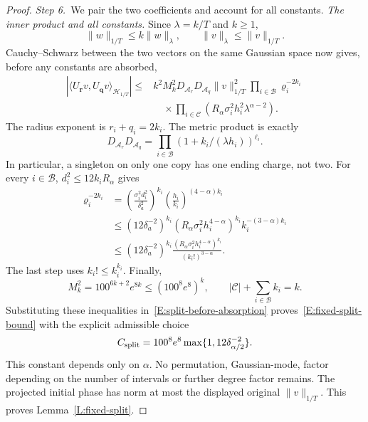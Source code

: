 \documentclass[12pt,oneside,openany]{book}
\numberwithin{equation}{section}
\theoremstyle{nogostyle}
\theoremstyle{definition}
\begin{document}
\begin{proof}
  \medskip
  \noindent\textit{Step 6.~}We pair the two coefficients and account for all
  constants.
  \emph{The inner product and all constants.} Since $\lambda = k/T$ and $k \ge
  1$,
  \[
    \|w\|_{1/T}\le k\|w\|_\lambda,\qquad
    \|v\|_\lambda\le\|v\|_{1/T}.
  \]
  Cauchy--Schwarz between the two vectors on the same Gaussian space now gives,
  before any constants are absorbed,
  \begin{equation}\label{E:split-before-absorption}
    \begin{split}
      |\langle U_{\boldsymbol r}v,U_{\boldsymbol q}v
      \rangle_{\mathcal{H}_{1/T}}|
      \le{}&k^2 M_k^2D_{\mathcal{A}_r}D_{\mathcal{A}_q}
      \|v\|_{1/T}^2
      \prod_{i\in\mathcal{B}}\varrho_i^{-2k_i}\\
      &\quad\times\prod_{i\in\mathcal{C}}
      (R_\alpha\sigma_i^2h_i^2\lambda^{\alpha-2}).
    \end{split}
  \end{equation}
  The radius exponent is $r_i+q_i = 2k_i$. The metric product is exactly
  \[
    D_{\mathcal{A}_r}D_{\mathcal{A}_q}
    =\prod_{i\in\mathcal{B}}(1+k_i/(\lambda h_i))^{\ell_i}.
  \]
  In particular, a singleton on only one copy has one ending charge, not two.
  For every $i \in \mathcal{B}$, $d_i^2 \le 12k_iR_\alpha$ gives
  \begin{equation}\label{E:split-radius-factorial}
    \begin{split}
      \varrho_i^{-2k_i}
      &=\left(\frac{\sigma_i^2d_i^2}{\delta_a^2}\right)^{k_i}
      \left(\frac{h_i}{k_i}\right)^{(4-\alpha)k_i}\\
      &\le(12\delta_a^{-2})^{k_i}
      (R_\alpha\sigma_i^2h_i^{4-\alpha})^{k_i}
      k_i^{-(3-\alpha)k_i}\\
      &\le(12\delta_a^{-2})^{k_i}
      \frac{(R_\alpha\sigma_i^2h_i^{4-\alpha})^{k_i}}
      {(k_i!)^{3-\alpha}}.
    \end{split}
  \end{equation}
  The last step uses $k_i! \le k_i^{k_i}$. Finally,
  \[
    M_k^2=100^{6k+2}e^{8k}\le(100^8e^8)^k,
    \qquad |\mathcal{C}|+\sum_{i\in\mathcal{B}}k_i=k.
  \]
  Substituting these inequalities in~\eqref{E:split-before-absorption}
  proves~\eqref{E:fixed-split-bound} with the explicit admissible choice
  \begin{equation}\label{E:split-explicit-constant}
    C_{\rm split}=100^8e^8
    \max\{1,12\delta_{\alpha/2}^{-2}\}.
  \end{equation}
  This constant depends only on $\alpha$. No permutation, Gaussian-mode, factor
  depending on the number of intervals or further degree factor remains. The
  projected initial phase has norm at most the displayed original $\|v\|_{1/T}$.
  This proves Lemma~\ref{L:fixed-split}.
\end{proof}
\end{document}
